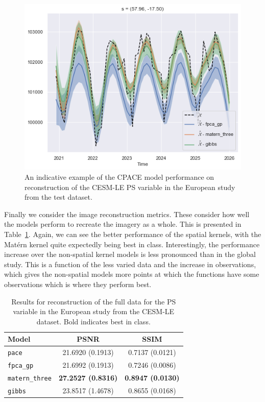 \begin{figure}
	\centering
	\includegraphics[width=\textwidth]{test_ex_ps_eur}
	\caption{An indicative example of the CPACE model performance on reconstruction of the CESM-LE PS variable in the European study from the test dataset.}
	\label{fig:test_ex_ps_eur}
\end{figure}

Finally we consider the image reconstruction metrics.
These consider how well the models perform to recreate the imagery as a whole. 
This is presented in Table~\ref{tab:full_cesm_ps_eur}.
Again, we can see the better performance of the spatial kernels, with the Mat\'ern kernel quite expectedly being best in class.
Interestingly, the performance increase over the non-spatial kernel models is less pronounced than in the global study.
This is a function of the less varied data and the increase in observations, which gives the non-spatial models more points at which the functions have some observations which is where they perform best.

\begin{table}
	\caption[Results for PS variable on full data in the European study]{Results for reconstruction of the full data for the PS variable in the European study from the CESM-LE dataset. Bold indicates best in class.}
	\centering
	\label{tab:full_cesm_ps_eur}
	\begin{tabular}{lcc}
		\toprule
		\textbf{Model} & \textbf{PSNR} & \textbf{SSIM} \\
		\midrule
		\verb*|pace| & 21.6920 (0.1913) & 0.7137 (0.0121) \\
		\verb*|fpca_gp| & 21.6992 (0.1913)& 0.7246	(0.0086) \\
		\verb*|matern_three| & \textbf{27.2527	(0.8316)}& \textbf{0.8947 (0.0130)}\\
		\verb*|gibbs| & 23.8517	(1.4678) & 0.8655 (0.0168)\\
		\bottomrule
	\end{tabular}
\end{table}

